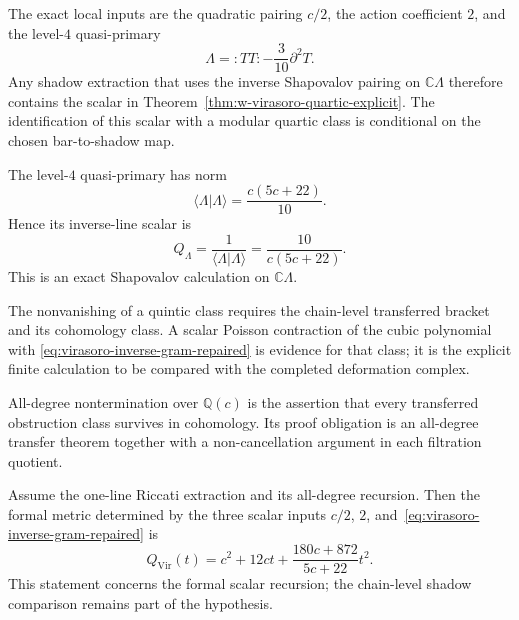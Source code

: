 \begin{theorem}
\label{thm:w-virasoro-mixed-shadow}
The exact local inputs are the quadratic pairing $c/2$, the action
coefficient $2$, and the level-$4$ quasi-primary
\[
\Lambda={:}TT{:}-\frac3{10}\partial^2T.
\]
Any shadow extraction that uses the inverse Shapovalov pairing on
$\mathbb C\Lambda$ therefore contains the scalar in
Theorem~\ref{thm:w-virasoro-quartic-explicit}.  The identification of
this scalar with a modular quartic class is conditional on the chosen
bar-to-shadow map.
\end{theorem}

\begin{theorem}
\label{thm:w-virasoro-quartic-explicit}
The level-$4$ quasi-primary has norm
\[
\langle\Lambda|\Lambda\rangle=\frac{c(5c+22)}{10}.
\]
Hence its inverse-line scalar is
\begin{equation}\label{eq:virasoro-inverse-gram-repaired}
Q_\Lambda=\frac{1}{\langle\Lambda|\Lambda\rangle}
=\frac{10}{c(5c+22)}.
\end{equation}
This is an exact Shapovalov calculation on $\mathbb C\Lambda$.
\end{theorem}

\begin{theorem}
\label{thm:w-virasoro-quintic-forced}
The nonvanishing of a quintic class requires the chain-level
transferred bracket and its cohomology class.  A scalar Poisson
contraction of the cubic polynomial with
\eqref{eq:virasoro-inverse-gram-repaired} is evidence for that class;
it is the explicit finite calculation to be compared with the
completed deformation complex.
\end{theorem}

\begin{corollary}
\label{cor:virasoro-postnikov-nontermination}
All-degree nontermination over $\mathbb Q(c)$ is the assertion that
every transferred obstruction class survives in cohomology.  Its
proof obligation is an all-degree transfer theorem together with a
non-cancellation argument in each filtration quotient.
\end{corollary}

\begin{theorem}
\label{thm:virasoro-shadow-generating-function}
Assume the one-line Riccati extraction and its all-degree recursion.
Then the formal metric determined by the three scalar inputs
$c/2$, $2$, and~\eqref{eq:virasoro-inverse-gram-repaired} is
\begin{equation}\label{eq:virasoro-formal-metric-repaired}
Q_{\mathrm{Vir}}(t)
=c^2+12ct+\frac{180c+872}{5c+22}t^2.
\end{equation}
This statement concerns the formal scalar recursion; the
chain-level shadow comparison remains part of the hypothesis.
\end{theorem}

